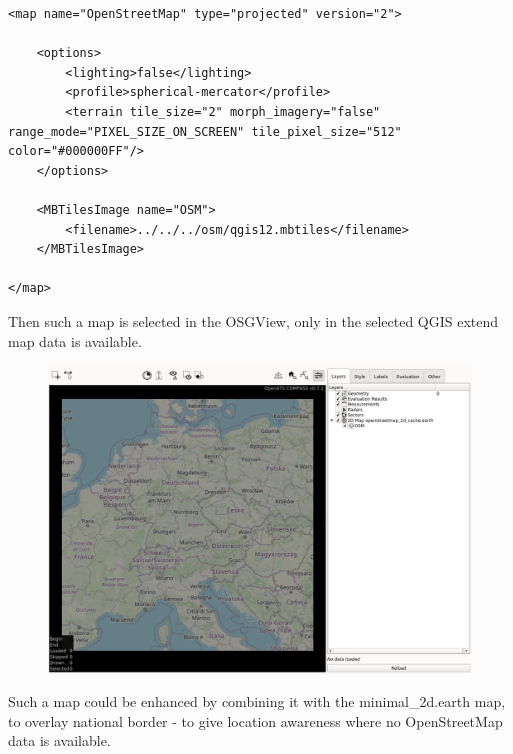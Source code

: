 \begin{lstlisting}
<map name="OpenStreetMap" type="projected" version="2">

    <options>
        <lighting>false</lighting>
        <profile>spherical-mercator</profile>
        <terrain tile_size="2" morph_imagery="false" range_mode="PIXEL_SIZE_ON_SCREEN" tile_pixel_size="512" color="#000000FF"/>
    </options>
    
    <MBTilesImage name="OSM">
        <filename>../../../osm/qgis12.mbtiles</filename>
    </MBTilesImage>
    
</map>
\end{lstlisting}

Then such a map is selected in the OSGView, only in the selected QGIS extend map data is available.

\begin{figure}[H]
    \hspace*{-2.5cm}
    \includegraphics[width=19cm,frame]{figures/osgview_qgis_osm1.png}
\end{figure}

Such a map could be enhanced by combining it with the minimal\_2d.earth map, to overlay national border - to give location awareness where no OpenStreetMap data is available.


